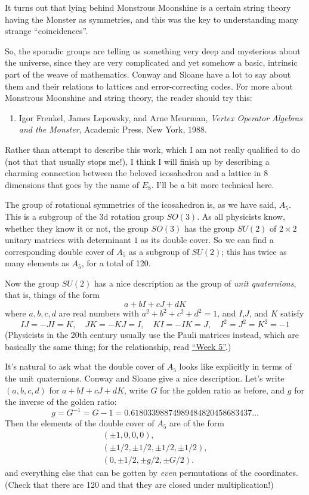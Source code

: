 \documentclass{article}
\def\tightlist{}
\begin{document}
It turns out that lying behind Monstrous Moonshine is a certain string
theory having the Monster as symmetries, and this was the key to
understanding many strange ``coincidences''.

So, the sporadic groups are telling us something very deep and
mysterious about the universe, since they are very complicated and yet
somehow a basic, intrinsic part of the weave of mathematics. Conway and
Sloane have a lot to say about them and their relations to lattices and
error-correcting codes. For more about Monstrous Moonshine and string
theory, the reader should try this:

\begin{enumerate}
\def\labelenumi{\arabic{enumi})}
\setcounter{enumi}{1}
\tightlist
\item
  Igor Frenkel, James Lepowsky, and Arne Meurman, \emph{Vertex Operator
  Algebras and the Monster}, Academic Press, New York, 1988.
\end{enumerate}

Rather than attempt to describe this work, which I am not really
qualified to do (not that that usually stops me!), I think I will finish
up by describing a charming connection between the beloved icosahedron
and a lattice in 8 dimensions that goes by the name of \(E_8\). I'll be
a bit more technical here.

The group of rotational symmetries of the icosahedron is, as we have
said, \(A_5\). This is a subgroup of the 3d rotation group \(SO(3)\). As
all physicists know, whether they know it or not, the group \(SO(3)\)
has the group \(SU(2)\) of \(2\times2\) unitary matrices with
determinant \(1\) as its double cover. So we can find a corresponding
double cover of \(A_5\) as a subgroup of \(SU(2)\); this has twice as
many elements as \(A_5\), for a total of 120.

Now the group \(SU(2)\) has a nice description as the group of
\emph{unit quaternions}, that is, things of the form
\[a + bI + cJ + dK\] where \(a,b,c,d\) are real numbers with
\(a^2 + b^2 + c^2 + d^2 = 1\), and \(I\),\(J\), and \(K\) satisfy
\[IJ = -JI = K, \quad JK = -KJ = I, \quad KI = -IK = J, \quad I^2 = J^2 = K^2 = -1\]
(Physicists in the 20th century usually use the Pauli matrices instead,
which are basically the same thing; for the relationship, read
\protect\hyperlink{week5}{``Week 5''}.)

It's natural to ask what the double cover of \(A_5\) looks like
explicitly in terms of the unit quaternions. Conway and Sloane give a
nice description. Let's write \((a,b,c,d)\) for \(a + bI + cJ + dK\),
write \(G\) for the golden ratio as before, and \(g\) for the inverse of
the golden ratio:
\[g = G^{-1} = G -1 = 0.61803398874989484820458683437\ldots\] Then the
elements of the double cover of \(A_5\) are of the form \[
  \begin{gathered}
    (\pm 1, 0, 0, 0),
  \\(\pm1/2, \pm1/2, \pm1/2, \pm1/2),
  \\(0, \pm1/2, \pm g/2, \pm G/2).
  \end{gathered}
\] and everything else that can be gotten by \emph{even} permutations of
the coordinates. (Check that there are 120 and that they are closed
under multiplication!)
\end{document}
